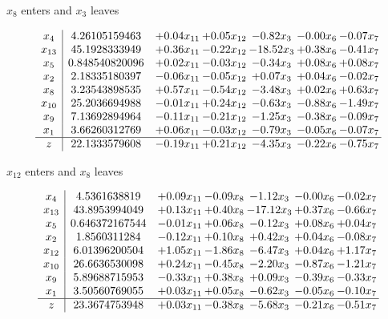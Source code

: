 \documentclass[9pt]{article}
\begin{document}
 $ x_{8} $ enters and $ x_{3} $ leaves 

 \[\begin{array}{c| c c@{\hskip 2pt} c@{\hskip 2pt} c@{\hskip 2pt} c@{\hskip 2pt} c@{\hskip 2pt} }
 x_{4}   &  4.26105159463 & +  0.04 x_{11} & +  0.05 x_{12} & -0.82 x_{3} & -0.00 x_{6} & -0.07 x_{7}\\
 x_{13}   &  45.1928333949 & +  0.36 x_{11} & -0.22 x_{12} & -18.52 x_{3} & +  0.38 x_{6} & -0.41 x_{7}\\
 x_{5}   &  0.848540820096 & +  0.02 x_{11} & -0.03 x_{12} & -0.34 x_{3} & +  0.08 x_{6} & +  0.08 x_{7}\\
 x_{2}   &  2.18335180397 & -0.06 x_{11} & -0.05 x_{12} & +  0.07 x_{3} & +  0.04 x_{6} & -0.02 x_{7}\\
 x_{8}   &  3.23543898535 & +  0.57 x_{11} & -0.54 x_{12} & -3.48 x_{3} & +  0.02 x_{6} & +  0.63 x_{7}\\
 x_{10}   &  25.2036694988 & -0.01 x_{11} & +  0.24 x_{12} & -0.63 x_{3} & -0.88 x_{6} & -1.49 x_{7}\\
 x_{9}   &  7.13692894964 & -0.11 x_{11} & -0.21 x_{12} & -1.25 x_{3} & -0.38 x_{6} & -0.09 x_{7}\\
 x_{1}   &  3.66260312769 & +  0.06 x_{11} & -0.03 x_{12} & -0.79 x_{3} & -0.05 x_{6} & -0.07 x_{7}\\
\hline
z    &  22.1333579608 & -0.19 x_{11} & +  0.21 x_{12} & -4.35 x_{3} & -0.22 x_{6} & -0.75 x_{7}\\
\end{array}\]


 $ x_{12} $ enters and $ x_{8} $ leaves 

 \[\begin{array}{c| c c@{\hskip 2pt} c@{\hskip 2pt} c@{\hskip 2pt} c@{\hskip 2pt} c@{\hskip 2pt} }
 x_{4}   &  4.5361638819 & +  0.09 x_{11} & -0.09 x_{8} & -1.12 x_{3} & -0.00 x_{6} & -0.02 x_{7}\\
 x_{13}   &  43.8953994049 & +  0.13 x_{11} & +  0.40 x_{8} & -17.12 x_{3} & +  0.37 x_{6} & -0.66 x_{7}\\
 x_{5}   &  0.646372167544 & -0.01 x_{11} & +  0.06 x_{8} & -0.12 x_{3} & +  0.08 x_{6} & +  0.04 x_{7}\\
 x_{2}   &  1.8560311284 & -0.12 x_{11} & +  0.10 x_{8} & +  0.42 x_{3} & +  0.04 x_{6} & -0.08 x_{7}\\
 x_{12}   &  6.01396200504 & +  1.05 x_{11} & -1.86 x_{8} & -6.47 x_{3} & +  0.04 x_{6} & +  1.17 x_{7}\\
 x_{10}   &  26.6636530098 & +  0.24 x_{11} & -0.45 x_{8} & -2.20 x_{3} & -0.87 x_{6} & -1.21 x_{7}\\
 x_{9}   &  5.89688715953 & -0.33 x_{11} & +  0.38 x_{8} & +  0.09 x_{3} & -0.39 x_{6} & -0.33 x_{7}\\
 x_{1}   &  3.50560769055 & +  0.03 x_{11} & +  0.05 x_{8} & -0.62 x_{3} & -0.05 x_{6} & -0.10 x_{7}\\
\hline
z    &  23.3674753948 & +  0.03 x_{11} & -0.38 x_{8} & -5.68 x_{3} & -0.21 x_{6} & -0.51 x_{7}\\
\end{array}\]
\end{document}
